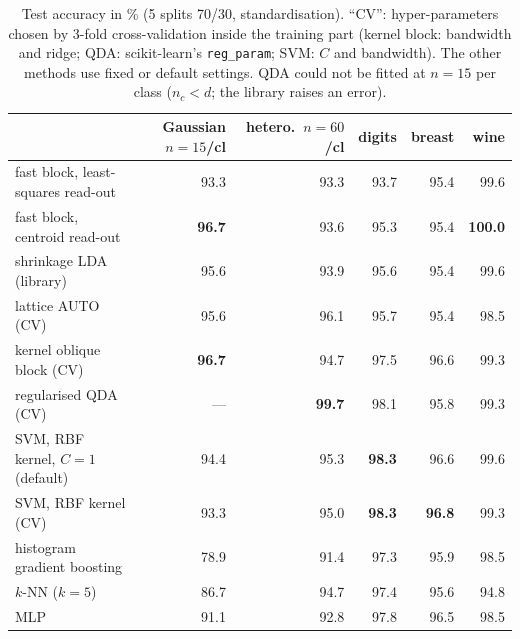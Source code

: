 \documentclass[11pt,a4paper]{article}
\theoremstyle{plain}
\theoremstyle{definition}
\theoremstyle{remark}
\begin{document}
\begin{table}[h]
\centering\small\renewcommand{\arraystretch}{1.12}
\caption{Test accuracy in \% (5 splits 70/30, standardisation). ``CV'': hyper-parameters chosen by 3-fold cross-validation inside the training part (kernel block: bandwidth and ridge; QDA: scikit-learn's \texttt{reg\_param}; SVM: $C$ and bandwidth). The other methods use fixed or default settings. QDA could not be fitted at $n=15$ per class ($n_c<d$; the library raises an error).}
\label{tab:alternatives}
\begin{tabular}{@{}lrrrrr@{}}
\toprule
 & Gaussian $n{=}15$/cl & hetero.\ $n{=}60$/cl & digits & breast & wine \\
\midrule
fast block, least-squares read-out & 93.3 & 93.3 & 93.7 & 95.4 & 99.6 \\
fast block, centroid read-out & \textbf{96.7} & 93.6 & 95.3 & 95.4 & \textbf{100.0} \\
shrinkage LDA (library) & 95.6 & 93.9 & 95.6 & 95.4 & 99.6 \\
lattice AUTO (CV) & 95.6 & 96.1 & 95.7 & 95.4 & 98.5 \\
kernel oblique block (CV) & \textbf{96.7} & 94.7 & 97.5 & 96.6 & 99.3 \\
regularised QDA (CV) & --- & \textbf{99.7} & 98.1 & 95.8 & 99.3 \\
SVM, RBF kernel, $C=1$ (default) & 94.4 & 95.3 & \textbf{98.3} & 96.6 & 99.6 \\
SVM, RBF kernel (CV) & 93.3 & 95.0 & \textbf{98.3} & \textbf{96.8} & 99.3 \\
histogram gradient boosting & 78.9 & 91.4 & 97.3 & 95.9 & 98.5 \\
$k$-NN ($k=5$) & 86.7 & 94.7 & 97.4 & 95.6 & 94.8 \\
MLP & 91.1 & 92.8 & 97.8 & 96.5 & 98.5 \\
\bottomrule
\end{tabular}
\end{table}
\end{document}
